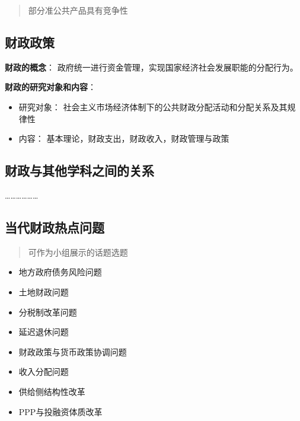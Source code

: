 \documentclass[
]{book}
\providecommand{\tightlist}{%
  \setlength{\itemsep}{0pt}\setlength{\parskip}{0pt}}
\theoremstyle{definition}
\theoremstyle{definition}
\theoremstyle{definition}
\theoremstyle{definition}
\theoremstyle{remark}
\begin{document}
\begin{quote}
部分准公共产品具有竞争性
\end{quote}

\hypertarget{ux8d22ux653fux653fux7b56}{%
\subsection{财政政策}\label{ux8d22ux653fux653fux7b56}}

\textbf{财政的概念}： 政府统一进行资金管理，实现国家经济社会发展职能的分配行为。

\textbf{财政的研究对象和内容}：

\begin{itemize}
\tightlist
\item
  研究对象： 社会主义市场经济体制下的公共财政分配活动和分配关系及其规律性
\item
  内容： 基本理论，财政支出，财政收入，财政管理与政策
\end{itemize}

\hypertarget{ux8d22ux653fux4e0eux5176ux4ed6ux5b66ux79d1ux4e4bux95f4ux7684ux5173ux7cfb}{%
\subsection{财政与其他学科之间的关系}\label{ux8d22ux653fux4e0eux5176ux4ed6ux5b66ux79d1ux4e4bux95f4ux7684ux5173ux7cfb}}

\ldots\ldots\ldots\ldots\ldots\ldots{}

\hypertarget{ux5f53ux4ee3ux8d22ux653fux70edux70b9ux95eeux9898}{%
\subsection{当代财政热点问题}\label{ux5f53ux4ee3ux8d22ux653fux70edux70b9ux95eeux9898}}

\begin{quote}
可作为小组展示的话题选题
\end{quote}

\begin{itemize}
\tightlist
\item
  地方政府债务风险问题
\item
  土地财政问题
\item
  分税制改革问题
\item
  延迟退休问题
\item
  财政政策与货币政策协调问题
\item
  收入分配问题
\item
  供给侧结构性改革
\item
  PPP与投融资体质改革
\end{itemize}
\end{document}
